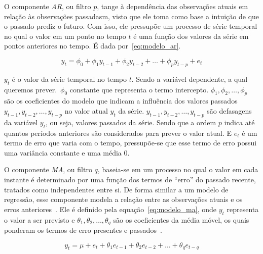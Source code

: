             O componente \emph{AR}, ou filtro \(p\), tange à dependência das observações atuais em relação às observações
            passadasm, visto que ele toma como base a intuição de que o passado prediz o futuro. Com isso, ele 
            pressupõe um processo de série temporal no qual o valor em um ponto no tempo \(t\) é uma função
            dos valores da série em pontos anteriores no tempo. É dada por~\eqref{eq:modelo_ar}.
            
            \begin{equation}
                y_t = \phi_0 + \phi_1 y_{t-1} + \phi_2 y_{t-2} + \ldots + \phi_p y_{t-p} + e_t
                \label{eq:modelo_ar}
            \end{equation}
            
            \(y_t\) é o valor da série temporal no tempo \(t\). Sendo a variável dependente, a qual queremos
            prever.~\(\phi_0\) constante que representa o termo intercepto. 
            \(\phi_1, \phi_2, \ldots, \phi_p \) são os coeficientes do modelo que
            indicam a influência dos valores passados \(y_{t-1}, y_{t-2}, \ldots, y_{t-p}\) no valor atual 
            \(y_t\) da série. \(y_{t-1}, y_{t-2}, \ldots, y_{t-p}\) são defasagens da variável \(y_t\), ou seja,
            valores passados da série. Sendo que a ordem \(p\) indica até quantos períodos anteriores são 
            considerados para prever o valor atual. E \(e_t\) é um termo de erro que varia com o tempo, pressupõe-se 
            que esse termo de erro possui uma variância constante e uma média 0.

            O componente \emph{MA}, ou filtro \(q\), baseia-se em um processo no qual o valor em cada 
            instante é determinado por uma função dos termos de ``erro'' do passado recente, tratados como 
            independentes entre si. De forma similar a um modelo de regressão, esse componente modela a 
            relação entre as observações atuais e os erros anteriores~\cite{nielsen2021analise,correa2024}.
            Ele é definido pela equação~\eqref{eq:modelo_ma}, onde \(y_t\) representa o valor a ser previsto e 
            \( \theta_1, \theta_2, \ldots, \theta_q \) são os coeficientes da média móvel, os quais ponderam 
            os termos de erro presentes e passados~\cite{nielsen2021analise}.

            \begin{equation}
                y_t = \mu + e_t + \theta_1 e_{t-1} + \theta_2 e_{t-2} + \ldots + \theta_q e_{t-q}
                \label{eq:modelo_ma}
            \end{equation}

